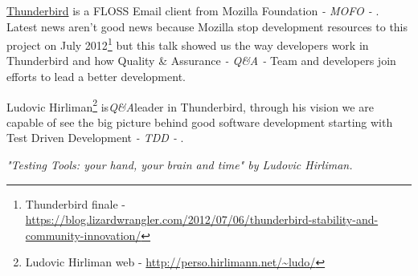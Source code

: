 \documentclass[11pt]{scrartcl}
\begin{document}
\par \href{http://www.mozilla.org/es-ES/thunderbird/}{Thunderbird} is a FLOSS Email client from Mozilla Foundation \textit{- MOFO -} . Latest news aren't good news because Mozilla stop development resources to this project on July 2012\footnote{Thunderbird finale - \url{https://blog.lizardwrangler.com/2012/07/06/thunderbird-stability-and-community-innovation/}} but this talk showed us the way developers work in Thunderbird and how Quality \& Assurance \textit{- Q\&A -} Team and developers join efforts to lead a better development.

\par Ludovic Hirliman\footnote{Ludovic Hirliman web - \url{http://perso.hirlimann.net/~ludo/}} is\textit{Q\&A}leader in Thunderbird, through his vision we are capable of see the big picture behind good software development starting with Test Driven Development \textit{- TDD -} .

\begin{center}
    \textit{"Testing Tools: your hand, your brain and time" by Ludovic Hirliman.}
\end{center}
\end{document}
